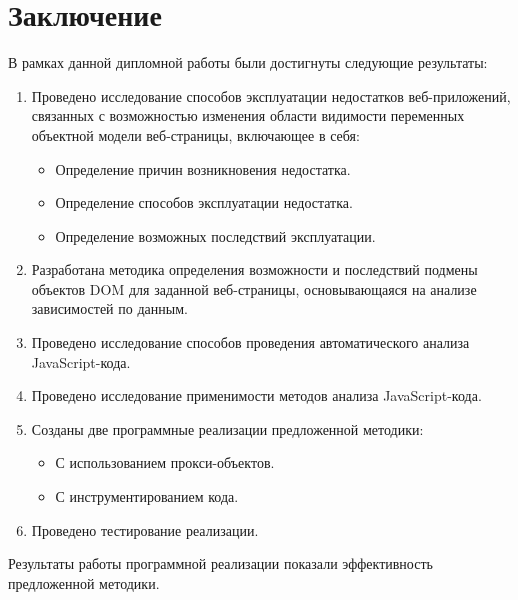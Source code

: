 
\chapter{Заключение}\label{Conclusion}

В рамках данной дипломной работы были достигнуты следующие результаты:

\begin{enumerate}
	\item Проведено исследование способов эксплуатации недостатков веб-приложений, связанных с возможностью изменения области видимости переменных объектной модели веб-страницы, включающее в себя:
		\begin{itemize}
			\item Определение причин возникновения недостатка.
			\item Определение способов эксплуатации недостатка.
			\item Определение возможных последствий эксплуатации.
		\end{itemize}

	\item Разработана методика определения возможности и последствий подмены объектов DOM для заданной веб-страницы, основывающаяся на анализе зависимостей по данным.
	\item Проведено исследование способов проведения автоматического анализа Java\-Script-кода.
	\item Проведено исследование применимости методов анализа JavaScript-кода.
	\item Созданы две программные реализации предложенной методики:
		\begin{itemize}
			\item С использованием прокси-объектов.
			\item С инструментированием кода.
		\end{itemize}
	\item Проведено тестирование реализации.
\end{enumerate}

Результаты работы программной реализации показали эффективность предложенной методики.